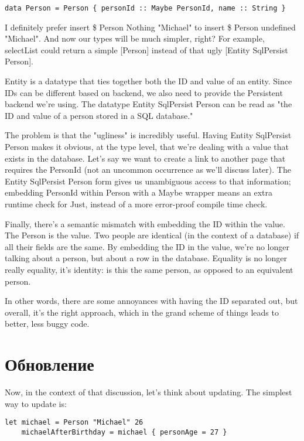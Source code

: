 \begin{lstlisting}
data Person = Person { personId :: Maybe PersonId, name :: String }
\end{lstlisting}

I definitely prefer insert \$ Person Nothing "Michael" to insert \$ Person undefined "Michael". And now our types will be much simpler, right? For example, selectList could return a simple [Person] instead of that ugly [Entity SqlPersist Person].

Entity is a datatype that ties together both the ID and value of an entity. Since IDs can be different based on backend, we also need to provide the Persistent backend we're using. The datatype Entity SqlPersist Person can be read as "the ID and value of a person stored in a SQL database."

The problem is that the "ugliness" is incredibly useful. Having Entity SqlPersist Person makes it obvious, at the type level, that we're dealing with a value that exists in the database. Let's say we want to create a link to another page that requires the PersonId (not an uncommon occurrence as we'll discuss later). The Entity SqlPersist Person form gives us unambiguous access to that information; embedding PersonId within Person with a Maybe wrapper means an extra runtime check for Just, instead of a more error-proof compile time check.

Finally, there's a semantic mismatch with embedding the ID within the value. The Person is the value. Two people are identical (in the context of a database) if all their fields are the same. By embedding the ID in the value, we're no longer talking about a person, but about a row in the database. Equality is no longer really equality, it's identity: is this the same person, as opposed to an equivalent person.

In other words, there are some annoyances with having the ID separated out, but overall, it's the right approach, which in the grand scheme of things leads to better, less buggy code.

\section{Обновление} %

Now, in the context of that discussion, let's think about updating. The simplest way to update is:

\begin{lstlisting}
let michael = Person "Michael" 26
    michaelAfterBirthday = michael { personAge = 27 }
\end{lstlisting}

